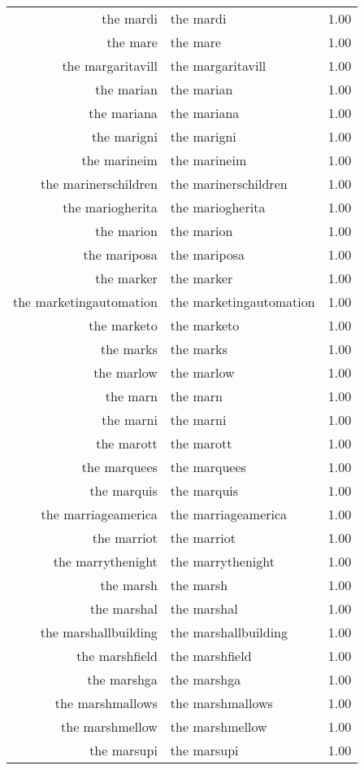 \begin{table}[ht]
\begin{tabular}{rlr}
  the mardi & the mardi & 1.00 \\ 
  the mare & the mare & 1.00 \\ 
  the margaritavill & the margaritavill & 1.00 \\ 
  the marian & the marian & 1.00 \\ 
  the mariana & the mariana & 1.00 \\ 
  the marigni & the marigni & 1.00 \\ 
  the marineim & the marineim & 1.00 \\ 
  the marinerschildren & the marinerschildren & 1.00 \\ 
  the mariogherita & the mariogherita & 1.00 \\ 
  the marion & the marion & 1.00 \\ 
  the mariposa & the mariposa & 1.00 \\ 
  the marker & the marker & 1.00 \\ 
  the marketingautomation & the marketingautomation & 1.00 \\ 
  the marketo & the marketo & 1.00 \\ 
  the marks & the marks & 1.00 \\ 
  the marlow & the marlow & 1.00 \\ 
  the marn & the marn & 1.00 \\ 
  the marni & the marni & 1.00 \\ 
  the marott & the marott & 1.00 \\ 
  the marquees & the marquees & 1.00 \\ 
  the marquis & the marquis & 1.00 \\ 
  the marriageamerica & the marriageamerica & 1.00 \\ 
  the marriot & the marriot & 1.00 \\ 
  the marrythenight & the marrythenight & 1.00 \\ 
  the marsh & the marsh & 1.00 \\ 
  the marshal & the marshal & 1.00 \\ 
  the marshallbuilding & the marshallbuilding & 1.00 \\ 
  the marshfield & the marshfield & 1.00 \\ 
  the marshga & the marshga & 1.00 \\ 
  the marshmallows & the marshmallows & 1.00 \\ 
  the marshmellow & the marshmellow & 1.00 \\ 
  the marsupi & the marsupi & 1.00 \\ 

\end{tabular}
\end{table}
